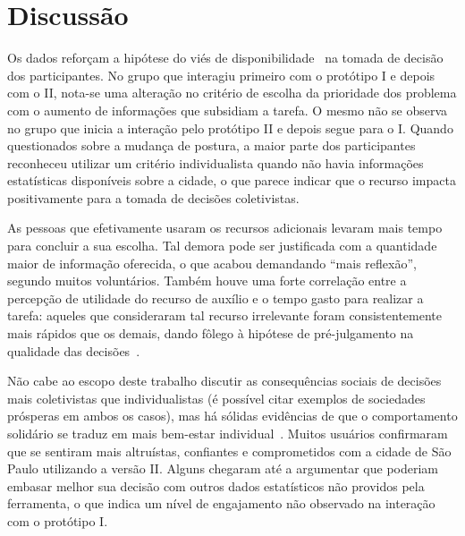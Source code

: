 \documentclass{sigchi}
\begin{document}
\section{Discussão}
Os dados reforçam a hipótese do viés de disponibilidade~\cite{tversky:1973} na tomada de decisão dos participantes. No grupo que interagiu primeiro com o protótipo I e depois com o II, nota-se uma alteração no critério de escolha da prioridade dos problema com o aumento de informações que subsidiam a tarefa. O mesmo não se observa no grupo que inicia a interação pelo protótipo II e depois segue para o I. Quando questionados sobre a mudança de postura, a maior parte dos participantes reconheceu utilizar um critério individualista quando não havia informações estatísticas disponíveis sobre a cidade, o que parece indicar que o recurso impacta positivamente para a tomada de decisões coletivistas.

As pessoas que efetivamente usaram os recursos adicionais levaram mais tempo para concluir a sua escolha. Tal demora pode ser justificada com a quantidade maior de informação oferecida, o que acabou demandando ``mais reflexão'', segundo muitos voluntários. Também houve uma forte correlação entre a percepção de utilidade do recurso de auxílio e o tempo gasto para realizar a tarefa: aqueles que consideraram tal recurso irrelevante foram consistentemente mais rápidos que os demais, dando fôlego à hipótese de pré-julgamento na qualidade das decisões~\cite{tversky:1986}.

Não cabe ao escopo deste trabalho discutir as consequências sociais de decisões mais coletivistas que individualistas (é possível citar exemplos de sociedades prósperas em ambos os casos), mas há sólidas evidências de que o comportamento solidário se traduz em mais bem-estar individual~\cite{thoits:2001}. Muitos usuários confirmaram que se sentiram mais altruístas, confiantes e comprometidos com a cidade de São Paulo utilizando a versão II. Alguns chegaram até a argumentar que poderiam embasar melhor sua decisão com outros dados estatísticos não providos pela ferramenta, o que indica um nível de engajamento não observado na interação com o protótipo I.


%
\end{document}
